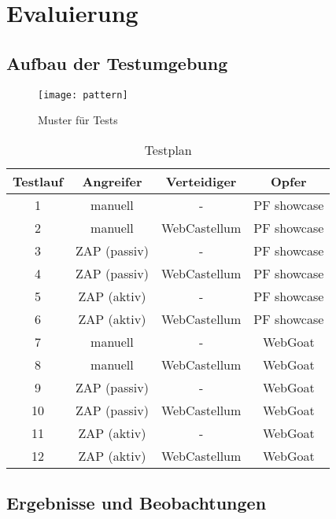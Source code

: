\chapter{Evaluierung}


\section{Aufbau der Testumgebung}

\begin{figure}[bht]
  \begin{center}
    \texttt{[image: pattern]}
    \caption{Muster für Tests}
    \label{fig.pattern}
  \end{center}
\end{figure}

\begin{table}[bht]
    \centering
    \begin{tabular}{ |c|c|c|c| } 
      \hline
    Testlauf & Angreifer & Verteidiger & Opfer \\ 
     \hline
     1 & manuell & - & PF showcase\\
     2 & manuell & WebCastellum & PF showcase \\
     3 & ZAP (passiv) & - & PF showcase\\
     4 & ZAP (passiv) & WebCastellum & PF showcase \\
     5 & ZAP (aktiv) & - & PF showcase\\
     6 & ZAP (aktiv) & WebCastellum & PF showcase \\
     7 & manuell & - & WebGoat \\ 
    8 & manuell & WebCastellum & WebGoat \\
    9 & ZAP (passiv) & - & WebGoat \\ 
    10 & ZAP (passiv) & WebCastellum & WebGoat \\
    11 & ZAP (aktiv) & - & WebGoat \\ 
    12 & ZAP (aktiv) & WebCastellum & WebGoat \\
   \hline
    \end{tabular}
    \caption{Testplan}
    \label{tab:testplan}
\end{table}

\section{Ergebnisse und Beobachtungen}

